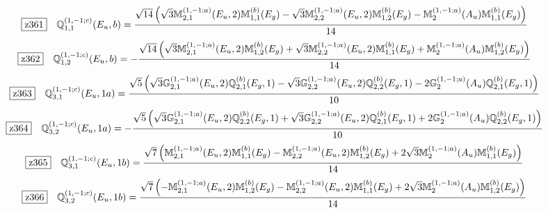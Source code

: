 \documentclass[fleqn,10pt,landscape]{jsarticle}
\begin{document}
\begin{dmath*}
\hspace*{3mm}\fbox{z361}\quad \mathbb{Q}_{1,1}^{(1,-1;c)}(E_{u},b)=\frac{\sqrt{14} \left(\sqrt{3} \mathbb{M}_{2,1}^{(1,-1;a)}(E_{u},2) \mathbb{M}_{1,1}^{(b)}(E_{g}) - \sqrt{3} \mathbb{M}_{2,2}^{(1,-1;a)}(E_{u},2) \mathbb{M}_{1,2}^{(b)}(E_{g}) - \mathbb{M}_{2}^{(1,-1;a)}(A_{u}) \mathbb{M}_{1,1}^{(b)}(E_{g})\right)}{14}
\end{dmath*}
\begin{dmath*}
\hspace*{3mm}\fbox{z362}\quad \mathbb{Q}_{1,2}^{(1,-1;c)}(E_{u},b)=- \frac{\sqrt{14} \left(\sqrt{3} \mathbb{M}_{2,1}^{(1,-1;a)}(E_{u},2) \mathbb{M}_{1,2}^{(b)}(E_{g}) + \sqrt{3} \mathbb{M}_{2,2}^{(1,-1;a)}(E_{u},2) \mathbb{M}_{1,1}^{(b)}(E_{g}) + \mathbb{M}_{2}^{(1,-1;a)}(A_{u}) \mathbb{M}_{1,2}^{(b)}(E_{g})\right)}{14}
\end{dmath*}
\begin{dmath*}
\hspace*{3mm}\fbox{z363}\quad \mathbb{Q}_{3,1}^{(1,-1;c)}(E_{u},1a)=\frac{\sqrt{5} \left(\sqrt{3} \mathbb{G}_{2,1}^{(1,-1;a)}(E_{u},2) \mathbb{Q}_{2,1}^{(b)}(E_{g},1) - \sqrt{3} \mathbb{G}_{2,2}^{(1,-1;a)}(E_{u},2) \mathbb{Q}_{2,2}^{(b)}(E_{g},1) - 2 \mathbb{G}_{2}^{(1,-1;a)}(A_{u}) \mathbb{Q}_{2,1}^{(b)}(E_{g},1)\right)}{10}
\end{dmath*}
\begin{dmath*}
\hspace*{3mm}\fbox{z364}\quad \mathbb{Q}_{3,2}^{(1,-1;c)}(E_{u},1a)=- \frac{\sqrt{5} \left(\sqrt{3} \mathbb{G}_{2,1}^{(1,-1;a)}(E_{u},2) \mathbb{Q}_{2,2}^{(b)}(E_{g},1) + \sqrt{3} \mathbb{G}_{2,2}^{(1,-1;a)}(E_{u},2) \mathbb{Q}_{2,1}^{(b)}(E_{g},1) + 2 \mathbb{G}_{2}^{(1,-1;a)}(A_{u}) \mathbb{Q}_{2,2}^{(b)}(E_{g},1)\right)}{10}
\end{dmath*}
\begin{dmath*}
\hspace*{3mm}\fbox{z365}\quad \mathbb{Q}_{3,1}^{(1,-1;c)}(E_{u},1b)=\frac{\sqrt{7} \left(\mathbb{M}_{2,1}^{(1,-1;a)}(E_{u},2) \mathbb{M}_{1,1}^{(b)}(E_{g}) - \mathbb{M}_{2,2}^{(1,-1;a)}(E_{u},2) \mathbb{M}_{1,2}^{(b)}(E_{g}) + 2 \sqrt{3} \mathbb{M}_{2}^{(1,-1;a)}(A_{u}) \mathbb{M}_{1,1}^{(b)}(E_{g})\right)}{14}
\end{dmath*}
\begin{dmath*}
\hspace*{3mm}\fbox{z366}\quad \mathbb{Q}_{3,2}^{(1,-1;c)}(E_{u},1b)=\frac{\sqrt{7} \left(- \mathbb{M}_{2,1}^{(1,-1;a)}(E_{u},2) \mathbb{M}_{1,2}^{(b)}(E_{g}) - \mathbb{M}_{2,2}^{(1,-1;a)}(E_{u},2) \mathbb{M}_{1,1}^{(b)}(E_{g}) + 2 \sqrt{3} \mathbb{M}_{2}^{(1,-1;a)}(A_{u}) \mathbb{M}_{1,2}^{(b)}(E_{g})\right)}{14}
\end{dmath*}
\end{document}
